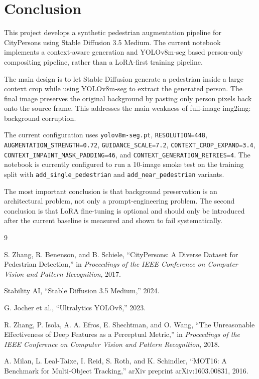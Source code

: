 \documentclass[12pt,a4paper]{article}
\begin{document}
\section{Conclusion}

This project develops a synthetic pedestrian augmentation pipeline for
CityPersons using Stable Diffusion 3.5 Medium. The current notebook implements a
context-aware generation and YOLOv8m-seg based person-only compositing pipeline,
rather than a LoRA-first training pipeline.

The main design is to let Stable Diffusion generate a pedestrian inside a large
context crop while using YOLOv8m-seg to extract the generated person. The final
image preserves the original background by pasting only person pixels back onto
the source frame. This addresses the main weakness of full-image img2img:
background corruption.

The current configuration uses \texttt{yolov8m-seg.pt}, \texttt{RESOLUTION=448},
\texttt{AUGMENTATION\_STRENGTH=0.72}, \texttt{GUIDANCE\_SCALE=7.2},
\texttt{CONTEXT\_CROP\_EXPAND=3.4}, \texttt{CONTEXT\_INPAINT\_MASK\_PADDING=46},
and \texttt{CONTEXT\_GENERATION\_RETRIES=4}. The notebook is currently configured
to run a 10-image smoke test on the training split with
\texttt{add\_single\_pedestrian} and \texttt{add\_near\_pedestrian} variants.

The most important conclusion is that background preservation is an architectural
problem, not only a prompt-engineering problem. The second conclusion is that
LoRA fine-tuning is optional and should only be introduced after the current
baseline is measured and shown to fail systematically.

\begin{thebibliography}{9}

S. Zhang, R. Benenson, and B. Schiele,
``CityPersons: A Diverse Dataset for Pedestrian Detection,''
in \textit{Proceedings of the IEEE Conference on Computer Vision and Pattern Recognition},
2017.

Stability AI,
``Stable Diffusion 3.5 Medium,''
2024.

G. Jocher et al.,
``Ultralytics YOLOv8,''
2023.

R. Zhang, P. Isola, A. A. Efros, E. Shechtman, and O. Wang,
``The Unreasonable Effectiveness of Deep Features as a Perceptual Metric,''
in \textit{Proceedings of the IEEE Conference on Computer Vision and Pattern Recognition},
2018.

A. Milan, L. Leal-Taixe, I. Reid, S. Roth, and K. Schindler,
``MOT16: A Benchmark for Multi-Object Tracking,''
arXiv preprint arXiv:1603.00831, 2016.

\end{thebibliography}
\end{document}
